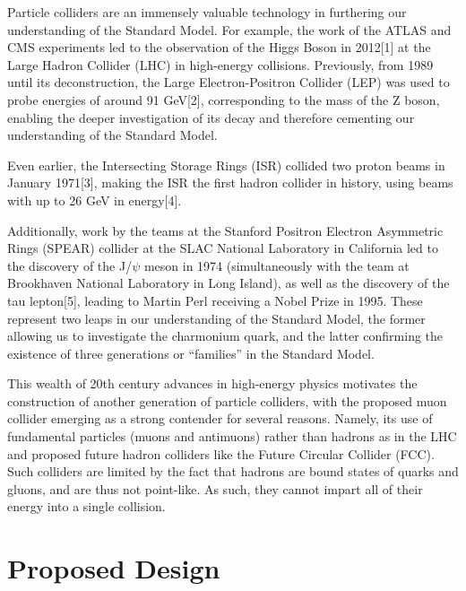 \documentclass{article}
\begin{document}
	
	\par Particle colliders are an immensely valuable technology in furthering our understanding of the Standard Model. For example, the work of the ATLAS and CMS experiments led to the observation of the Higgs Boson in 2012[1] at the Large Hadron Collider (LHC) in high-energy collisions. Previously, from 1989 until its deconstruction, the Large Electron-Positron Collider (LEP) was used to probe energies of around 91 GeV[2], corresponding to the mass of the Z boson, enabling the deeper investigation of its decay and therefore cementing our understanding of the Standard Model.
	\par Even earlier, the Intersecting Storage Rings (ISR) collided two proton beams in January 1971[3], making the ISR the first hadron collider in history, using beams with up to 26 GeV in energy[4].
	\par Additionally, work by the teams at the Stanford Positron Electron Asymmetric Rings (SPEAR) collider at the SLAC National Laboratory in California led to the discovery of the J/$\psi$ meson in 1974 (simultaneously with the team at Brookhaven National Laboratory in Long Island), as well as the discovery of the tau lepton[5], leading to Martin Perl receiving a Nobel Prize in 1995. These represent two leaps in our understanding of the Standard Model, the former allowing us to investigate the charmonium quark, and the latter confirming the existence of three generations or “families” in the Standard Model.
	\par This wealth of 20th century advances in high-energy physics motivates the construction of another generation of particle colliders, with the proposed muon collider emerging as a strong contender for several reasons. Namely, its use of fundamental particles (muons and antimuons) rather than hadrons as in the LHC and proposed future hadron colliders like the Future Circular Collider (FCC). Such colliders are limited by the fact that hadrons are bound states of quarks and gluons, and are thus not point-like. As such, they cannot impart all of their energy into a single collision.
	
	
	\section{Proposed Design}
	
\end{document}
